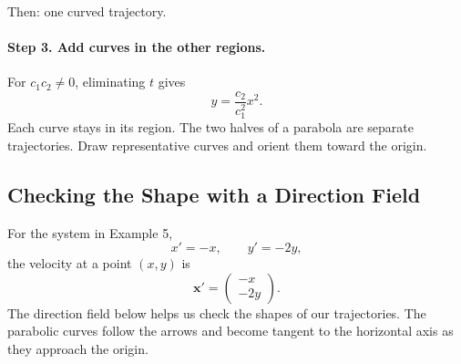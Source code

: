\documentclass[11pt,letterpaper]{article}
\begin{document}
\begin{example}[5]
\begin{center}
\begin{minipage}[t]{.47\linewidth}
\small Then: one curved trajectory.
\end{minipage}
\end{center}
\paragraph{Step 3. Add curves in the other regions.}
For $c_1c_2\ne0$, eliminating $t$ gives
\[
 y=\frac{c_2}{c_1^2}x^2.
\]
Each curve stays in its region. The two halves of a parabola are separate
trajectories. Draw representative curves and orient them toward the origin.
\end{example}



\subsection{Checking the Shape with a Direction Field}

For the system in Example 5,
\[
    x'=-x,\qquad y'=-2y,
\]
the velocity at a point $(x,y)$ is
\[
    \mathbf{x}'=
    \begin{pmatrix}-x\\-2y\end{pmatrix}.
\]
The direction field below helps us check the shapes
of our trajectories. The parabolic curves follow
the arrows and become tangent to the horizontal
axis as they approach the origin.
\end{document}
